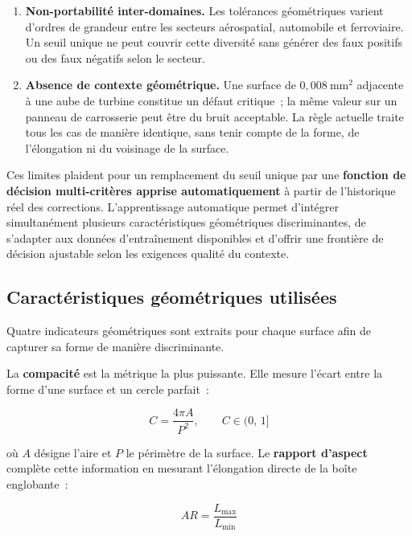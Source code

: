 \begin{enumerate}
    \item \textbf{Non-portabilité inter-domaines.} Les tolérances géométriques varient d'ordres de grandeur entre les secteurs aérospatial, automobile et ferroviaire. Un seuil unique ne peut couvrir cette diversité sans générer des faux positifs ou des faux négatifs selon le secteur.

    \item \textbf{Absence de contexte géométrique.} Une surface de $0{,}008~\text{mm}^2$ adjacente à une aube de turbine constitue un défaut critique~; la même valeur sur un panneau de carrosserie peut être du bruit acceptable. La règle actuelle traite tous les cas de manière identique, sans tenir compte de la forme, de l'élongation ni du voisinage de la surface.
\end{enumerate}

Ces limites plaident pour un remplacement du seuil unique par une \textbf{fonction de décision multi-critères apprise automatiquement} à partir de l'historique réel des corrections. L'apprentissage automatique permet d'intégrer simultanément plusieurs caractéristiques géométriques discriminantes, de s'adapter aux données d'entraînement disponibles et d'offrir une frontière de décision ajustable selon les exigences qualité du contexte.

\subsection{Caractéristiques géométriques utilisées}
\label{subsec:features}

Quatre indicateurs géométriques sont extraits pour chaque surface afin de capturer sa forme de manière discriminante.

La \textbf{compacité} est la métrique la plus puissante. Elle mesure l'écart entre la forme d'une surface et un cercle parfait~:

\begin{equation}
    C = \frac{4\pi A}{P^2}, \qquad C \in (0,\,1]
    \label{eq:compacite}
\end{equation}

où $A$ désigne l'aire et $P$ le périmètre de la surface. Le \textbf{rapport d'aspect} complète cette information en mesurant l'élongation directe de la boîte englobante~:

\begin{equation}
    AR = \frac{L_{\max}}{L_{\min}}
    \label{eq:aspect-ratio}
\end{equation}

